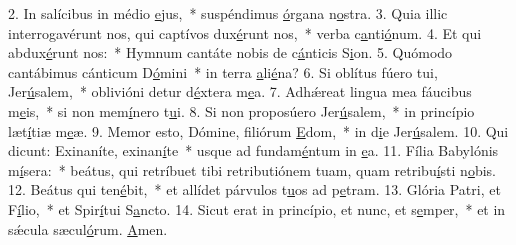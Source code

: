 2. In salícibus in médio \uline{e}jus,~* suspéndimus \uline{ó}rgana n\uline{o}stra.
3. Quia illic interrogavérunt nos, qui captívos dux\uline{é}runt nos,~* verba c\uline{a}nti\uline{ó}num.
4. Et qui abdux\uline{é}runt nos:~* Hymnum cantáte nobis de c\uline{á}nticis S\uline{i}on.
5. Quómodo cantábimus cánticum D\uline{ó}mini~* in terra \uline{a}li\uline{é}na?
6. Si oblítus fúero tui, Jer\uline{ú}salem,~* oblivióni detur d\uline{é}xtera m\uline{e}a.
7. Adhǽreat lingua mea fáucibus m\uline{e}is,~* si non mem\uline{í}nero t\uline{u}i.
8. Si non proposúero Jer\uline{ú}salem,~* in princípio læt\uline{í}tiæ m\uline{e}æ.
9. Memor esto, Dómine, filiórum \uline{E}dom,~* in d\uline{i}e Jer\uline{ú}salem.
10. Qui dicunt: Exinaníte, exinan\uline{í}te~* usque ad fundam\uline{é}ntum in \uline{e}a.
11. Fília Babylónis m\uline{í}sera:~* beátus, qui retríbuet tibi retributiónem tuam, quam retribu\uline{í}sti n\uline{o}bis.
12. Beátus qui ten\uline{é}bit,~* et allídet párvulos t\uline{u}os ad p\uline{e}tram.
13. Glória Patri, et F\uline{í}lio,~* et Spir\uline{í}tui S\uline{a}ncto.
14. Sicut erat in princípio, et nunc, et s\uline{e}mper,~* et in sǽcula sæcul\uline{ó}rum. \uline{A}men.

